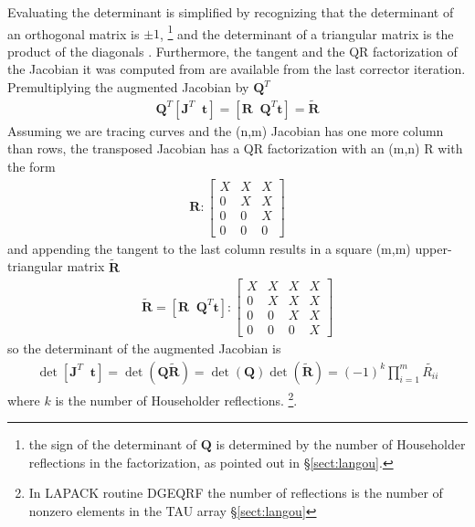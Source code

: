 \documentclass[10pt,openany,twoside]{book}
\numberwithin{equation}{section}   %
\newcommand{\Matrix}[1]{\boldsymbol{#1}}
\newcommand{\Vector}[1]{\boldsymbol{#1}}
\newcommand{\Sectref}[1]{\S\ref{#1}}
\begin{document}
Evaluating the determinant is simplified by recognizing that
the determinant of an orthogonal matrix is $\pm 1$,
\footnote{the sign of the determinant of $\Matrix{Q}$ is determined by the
number of Householder reflections in the factorization, as pointed out in
\Sectref{sect:langou}.}
and the determinant of a triangular matrix
is the product of the diagonals \cite{meyer2015continuation}.
Furthermore, the tangent and the QR factorization of the Jacobian
it was computed from are available from the last corrector iteration.
Premultiplying the augmented Jacobian by $\Matrix{Q}^T$
\begin{align*}
	\Matrix{Q}^T \left[ \Matrix{J}^T \;\; \Vector{t} \right] =
		\left[ \Matrix{R} \;\; \Matrix{Q}^T \Vector{t} \right] =
		\tilde{\Matrix{R}}
\end{align*}
Assuming we are tracing curves and the (n,m) Jacobian has one more
column than rows, the transposed Jacobian has a QR factorization
with an (m,n) R with the form
\begin{align*}
	\Vector{R}: \left[ \begin{array}{ccc}
		X & X & X \\
		0 & X & X \\
		0 & 0 & X \\
		0 & 0 & 0
		\end{array} \right]
\end{align*}
and appending the tangent to the last column results in a square
(m,m) upper-triangular matrix $\tilde{\Matrix{R}}$
\begin{align*}
	\tilde{\Matrix{R}} =\left[\Vector{R} \;\; \Matrix{Q}^T\Vector{t} \right]:
		\left[ \begin{array}{cccc}
		X & X & X & X \\
		0 & X & X & X \\
		0 & 0 & X & X \\
		0 & 0 & 0 & X
		\end{array} \right]
\end{align*}
so the determinant of the augmented Jacobian is
\begin{align*}
	\det \left[ \Matrix{J}^T \;\; \Vector{t} \right] =
		\det\left( \Matrix{Q}\tilde{\Matrix{R}} \right) =
		\det\left( \Matrix{Q} \right) \det\left(\tilde{\Matrix{R}} \right) =
		(-1)^k \prod_{i=1}^m \tilde{R_{ii}}
\end{align*}
where $k$ is the number of Householder reflections.
\footnote{In LAPACK routine DGEQRF the number of reflections is the
number of nonzero elements in the TAU array \Sectref{sect:langou}}.
\end{document}
